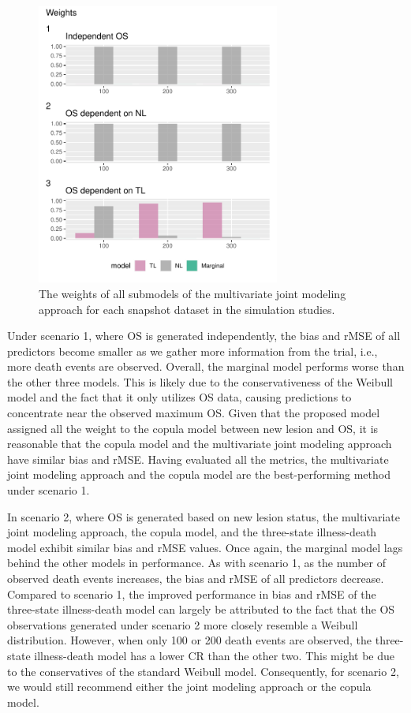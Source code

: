 \begin{figure}
\centering
\includegraphics[width=8cm]{chapters/figures/Weights_simulation.pdf}
\caption{The weights of all submodels of the multivariate joint modeling approach for each snapshot dataset in the simulation studies.\label{fig:weights_simulation}}
\end{figure}

Under scenario 1, where \ac{OS} is generated independently, the bias and \ac{rMSE} of all predictors become smaller as we gather more information from the trial, i.e., more death events are observed. Overall, the marginal model performs worse than the other three models. This is likely due to the conservativeness of the Weibull model and the fact that it only utilizes \ac{OS} data, causing predictions to concentrate near the observed maximum OS. Given that the proposed model assigned all the weight to the copula model between new lesion and OS, it is reasonable that the copula model and the multivariate joint modeling approach have similar bias and \ac{rMSE}. Having evaluated all the metrics, the multivariate joint modeling approach and the copula model are the best-performing method under scenario 1.

In scenario 2, where \ac{OS} is generated based on new lesion status, the multivariate joint modeling approach, the copula model, and the three-state illness-death model exhibit similar bias and \ac{rMSE} values. Once again, the marginal model lags behind the other models in performance. As with scenario 1, as the number of observed death events increases, the bias and \ac{rMSE} of all predictors decrease. Compared to scenario 1, the improved performance in bias and \ac{rMSE} of the three-state illness-death model can largely be attributed to the fact that the \ac{OS} observations generated under scenario 2 more closely resemble a Weibull distribution. However, when only 100 or 200 death events are observed, the three-state illness-death model has a lower \ac{CR} than the other two. This might be due to the conservatives of the standard Weibull model. Consequently, for scenario 2, we would still recommend either the joint modeling approach or the copula model.

